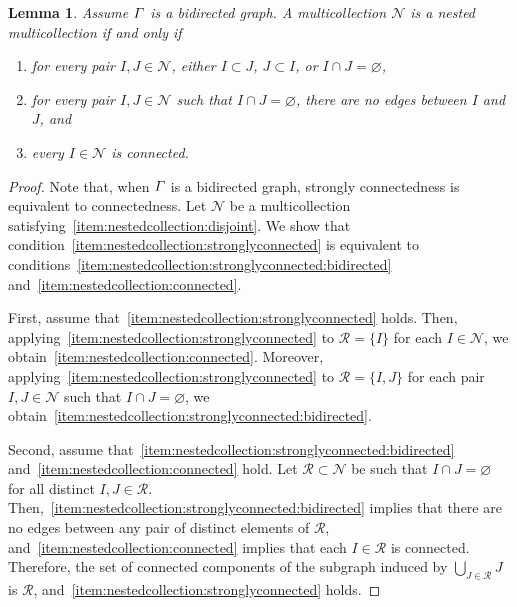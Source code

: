 \documentclass[11pt]{article}
\newtheorem{lemm}[theo]{Lemma}
\theoremstyle{definition}
\numberwithin{equation}{section}
\begin{document}
\begin{lemm} \label{lemma:nestedcollection:bidirected}
    Assume \(\varGamma\) is a bidirected graph.
    A multicollection \(\mathcal{N}\) is a nested multicollection if and only if
    \begin{enumerate}[label = \textup{(N\arabic*')}, ref = (N\arabic*'), leftmargin = .6in]
        \item[\textup{(N1)}]
        for every pair \(I, J \in \mathcal{N}\),
        either \(I \subset J\), \(J \subset I\), or \(I \cap J = \varnothing\),
        \setcounter{enumi}{1}
        \item \label{item:nestedcollection:stronglyconnected:bidirected}
        for every pair \(I, J \in \mathcal{N}\) such that \(I \cap J = \varnothing\),
        there are no edges between \(I\) and \(J\), and
        \item \label{item:nestedcollection:connected}
        every \(I \in \mathcal{N}\) is connected.
    \end{enumerate}
\end{lemm}

\begin{proof}
    Note that, when \(\varGamma\) is a bidirected graph,
    strongly connectedness is equivalent to connectedness.
    Let \(\mathcal{N}\) be a multicollection satisfying~\ref{item:nestedcollection:disjoint}.
    We show that condition~\ref{item:nestedcollection:stronglyconnected} is equivalent to conditions~\ref{item:nestedcollection:stronglyconnected:bidirected} and~\ref{item:nestedcollection:connected}.

    First, assume that~\ref{item:nestedcollection:stronglyconnected} holds.
    Then, applying~\ref{item:nestedcollection:stronglyconnected} to \(\mathcal{R} = \{I\}\) for each \(I \in \mathcal{N}\), we obtain~\ref{item:nestedcollection:connected}.
    Moreover, applying~\ref{item:nestedcollection:stronglyconnected} to \(\mathcal{R} = \{I, J\}\) for each pair \(I, J \in \mathcal{N}\) such that \(I \cap J = \varnothing\), we obtain~\ref{item:nestedcollection:stronglyconnected:bidirected}.

    Second, assume that~\ref{item:nestedcollection:stronglyconnected:bidirected} and~\ref{item:nestedcollection:connected} hold.
    Let \(\mathcal{R} \subset \mathcal{N}\) be such that \(I \cap J = \varnothing\) for all distinct \(I, J \in \mathcal{R}\).
    Then,~\ref{item:nestedcollection:stronglyconnected:bidirected} implies that there are no edges between any pair of distinct elements of \(\mathcal{R}\), and~\ref{item:nestedcollection:connected} implies that each \(I \in \mathcal{R}\) is connected.
    Therefore, the set of connected components of the subgraph induced by \(\bigcup_{J \in \mathcal{R}} J\) is \(\mathcal{R}\),
    and~\ref{item:nestedcollection:stronglyconnected} holds.
\end{proof}
\end{document}

